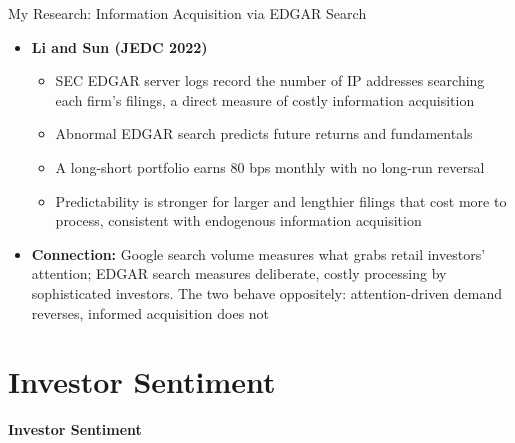 \documentclass[aspectratio=169, 11pt]{beamer}
\begin{document}
\begin{frame}[shrink=5]{My Research: Information Acquisition via EDGAR Search}
	\begin{itemize}
		\item \textbf{Li and Sun (JEDC 2022)}
		\begin{itemize}
			\item SEC EDGAR server logs record the number of IP addresses searching each firm's filings, a direct measure of costly information acquisition
			\item Abnormal EDGAR search predicts future returns and fundamentals
			\item A long-short portfolio earns 80 bps monthly with no long-run reversal
			\item Predictability is stronger for larger and lengthier filings that cost more to process, consistent with endogenous information acquisition
		\end{itemize}
		\item \textbf{Connection:} Google search volume measures what grabs retail investors' attention; EDGAR search measures deliberate, costly processing by sophisticated investors. The two behave oppositely: attention-driven demand reverses, informed acquisition does not
	\end{itemize}
\end{frame}

\section{Investor Sentiment}

\begin{frame}{}
\vfill
\centering
{\Large \textbf{Investor Sentiment}}
\vfill
\end{frame}
\end{document}

